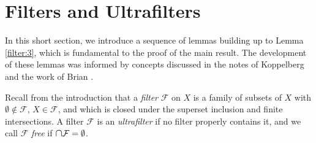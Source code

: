 \section{Filters and Ultrafilters}
In this short section, we introduce a sequence of lemmas building up to Lemma \ref{filter:3}, which is fundamental to the proof of the main result. The development of these lemmas was informed by concepts discussed in the notes of Koppelberg \cite{notes:2011} and the work of Brian \cite{brian:2016}.

Recall from the introduction that a \emph{filter} \( \mathcal{F}  \) on \( X \) is a family of subsets of \( X \) with \( \emptyset \notin \mathcal{F}  \), \( X \in \mathcal{F}  \), and which is closed under the superset inclusion and finite intersections. A filter \( \mathcal{F}  \) is an \emph{ultrafilter} if no filter properly contains it, and we call \( \mathcal{F}  \) \emph{free} if \( \medcap \mathcal{F} = \emptyset  \). 

